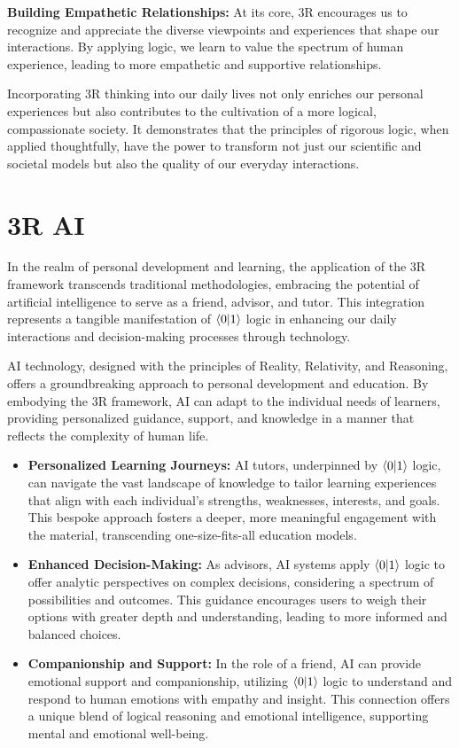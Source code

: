 \documentclass[12pt]{article}
\begin{document}
\textbf{Building Empathetic Relationships:} At its core, 3R encourages us to recognize and appreciate the diverse viewpoints and experiences that shape our interactions. By applying \qbit{} logic, we learn to value the spectrum of human experience, leading to more empathetic and supportive relationships.

Incorporating 3R thinking into our daily lives not only enriches our personal experiences but also contributes to the cultivation of a more logical, compassionate society. It demonstrates that the principles of rigorous logic, when applied thoughtfully, have the power to transform not just our scientific and societal models but also the quality of our everyday interactions.

\section*{3R AI}

In the realm of personal development and learning, the application of the 3R framework transcends traditional methodologies, embracing the potential of artificial intelligence to serve as a friend, advisor, and tutor. This integration represents a tangible manifestation of \(\langle 0 | 1 \rangle\) logic in enhancing our daily interactions and decision-making processes through technology.

AI technology, designed with the principles of Reality, Relativity, and Reasoning, offers a groundbreaking approach to personal development and education. By embodying the 3R framework, AI can adapt to the individual needs of learners, providing personalized guidance, support, and knowledge in a manner that reflects the complexity of human life.

\begin{itemize}
    \item \textbf{Personalized Learning Journeys:} AI tutors, underpinned by \(\langle 0 | 1 \rangle\) logic, can navigate the vast landscape of knowledge to tailor learning experiences that align with each individual's strengths, weaknesses, interests, and goals. This bespoke approach fosters a deeper, more meaningful engagement with the material, transcending one-size-fits-all education models.
    \item \textbf{Enhanced Decision-Making:} As advisors, AI systems apply \(\langle 0 | 1 \rangle\) logic to offer analytic perspectives on complex decisions, considering a spectrum of possibilities and outcomes. This guidance encourages users to weigh their options with greater depth and understanding, leading to more informed and balanced choices.
    \item \textbf{Companionship and Support:} In the role of a friend, AI can provide emotional support and companionship, utilizing \(\langle 0 | 1 \rangle\) logic to understand and respond to human emotions with empathy and insight. This connection offers a unique blend of logical reasoning and emotional intelligence, supporting mental and emotional well-being.
\end{itemize}
\end{document}
